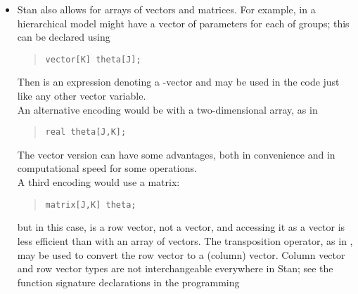 \begin{itemize}
{truncated versions may not exist and may not be vectorized.}
%
allowing
%
\begin{quote}
\begin{Verbatim}[fontsize=\small]
for (i in 1:n) 
  y[i] ~ normal(mu[i], sigma[i]);
\end{Verbatim}
\end{quote}
%
to be expressed more compactly as 
%
\begin{quote}
\begin{Verbatim}[fontsize=\small]
y ~ normal(mu,sigma);
\end{Verbatim}
\end{quote}
%
The vectorized form is also more efficient because Stan can unfold the
computation of the chain rule during algorithmic differentiation.
%
\item Stan also allows for arrays of vectors and matrices.
  For example, in a hierarchical model might have a vector of 
  parameters for each of  groups; this can be declared using
\begin{quote}
\begin{Verbatim}[fontsize=\small]
vector[K] theta[J];
\end{Verbatim}
\end{quote}
%
Then  is an expression denoting a -vector and
may be used in the code just like any other vector variable.
\\[6pt]
An alternative encoding would be with a two-dimensional array, as in
\begin{quote}
\begin{Verbatim}[fontsize=\small]
real theta[J,K];
\end{Verbatim}
\end{quote}
%
The vector version can have some advantages, both in convenience and
in computational speed for some operations.
\\[6pt]
A third encoding would use a matrix:
%
\begin{quote}
\begin{Verbatim}[fontsize=\small]
matrix[J,K] theta;
\end{Verbatim}
\end{quote}
%
but in this case,  is a row vector, not a vector, and
accessing it as a vector is less efficient than with an array of
vectors.  The transposition operator, as in , may be
used to convert the row vector  to a (column) vector.
Column vector and row vector types are not interchangeable everywhere
in Stan; see the function signature declarations in the programming

\end{itemize}
